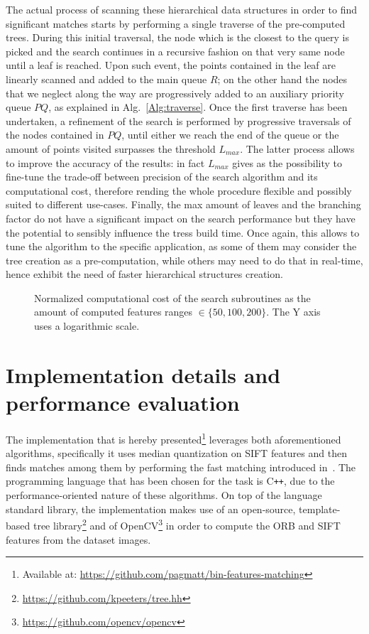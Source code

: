 \documentclass[a4paper, 11pt, oneside]{article}
\newlength\fheight
\newlength\fwidth
\begin{document}
The actual process of scanning these hierarchical data structures in order to find significant matches starts by performing a single traverse of the pre-computed trees. During this initial traversal, the node which is the closest to the query is picked and the search continues in a recursive fashion on that very same node until a leaf is reached. Upon such event, the points contained in the leaf are linearly scanned and added to the main queue $R$; on the other hand the nodes that we neglect along the way are progressively added to an auxiliary priority queue $PQ$, as explained in Alg.~\ref{Alg:traverse}. Once the first traverse has been undertaken, a refinement of the search is performed by progressive traversals of the nodes contained in $PQ$, until either we reach the end of the queue or the amount of points visited surpasses the threshold $L_{max}$. The latter process allows to improve the accuracy of the results: in fact $L_{max}$ gives as the possibility to fine-tune the trade-off between precision of the search algorithm and its computational cost, therefore rending the whole procedure flexible and possibly suited to different use-cases. Finally, the max amount of leaves and the branching factor do not have a significant impact on the search performance but they have the potential to sensibly influence the tress build time. Once again, this allows to tune the algorithm to the specific application, as some of them may consider the tree creation as a pre-computation, while others may need to do that in real-time, hence exhibit the need of faster hierarchical structures creation.

    
\begin{figure}[h!]
  \centering
    \setlength{}
    \setlength{}
    
    \setlength\belowcaptionskip{-.3cm}
    \captionsetup{justification=centering}
    \caption{Normalized computational cost of the search subroutines as the amount of computed features ranges $\in \{50, 100, 200\}$. The Y axis uses a logarithmic scale.}
    \label{Fig:perf_cost}
\end{figure}    

\section*{Implementation details and performance evaluation} 
The implementation that is hereby presented\footnote{Available at: \url{https://github.com/pagmatt/bin-features-matching}} leverages both aforementioned algorithms, specifically it uses median quantization on SIFT features and then finds matches among them by performing the fast matching introduced in~\cite{muja2012fast}. The programming language that has been chosen for the task is C\texttt{++}, due to the performance-oriented nature of these algorithms. On top of the language standard library, the implementation makes use of an open-source, template-based tree library\footnote{\url{https://github.com/kpeeters/tree.hh}} and of OpenCV\footnote{\url{https://github.com/opencv/opencv}} in order to compute the ORB and SIFT features from the dataset images.
\end{document}
